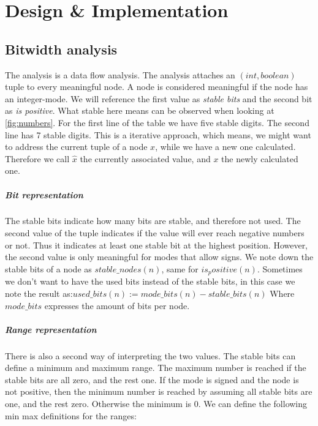 \chapter{Design \& Implementation}\label{sec:impl}

\section{Bitwidth analysis}
The analysis is a data flow analysis. The analysis attaches an $(int,boolean)$ tuple to every meaningful node. A node is considered meaningful if the node has an integer-mode. We will reference the first value as \emph{stable bits} and the second bit as \emph{is positive}. \newline
What stable here means can be observed when looking at \ref{fig:numbers}.
For the first line of the table we have five stable digits. The second line has 7 stable digits.\newline
This is a iterative approach, which means, we might want to address the current tuple of a node $x$, while we have a new one calculated. Therefore we call $\hat{x}$ the currently associated value, and $x$ the newly calculated one.

\paragraph{Bit representation}
The stable bits indicate how many bits are stable, and therefore not used.
The second value of the tuple indicates if the value will ever reach negative numbers or not. Thus it indicates at least one stable bit at the highest position. However, the second value is only meaningful for modes that allow signs. We note down the stable bits of a node as $stable\_nodes(n)$, same for $is_positive(n)$.
Sometimes we don't want to have the used bits instead of the stable bits, in this case we note the result as:$used\_bits(n):=mode\_bits(n)-stable\_bits(n)$
Where $mode\_bits$ expresses the amount of bits per node.

\paragraph{Range representation}
There is also a second way of interpreting the two values. The stable bits can define a minimum and maximum range. The maximum number is reached if the stable bits are all zero, and the rest one. If the mode is signed and the node is not positive, then the minimum number is reached by assuming all stable bits are one, and the rest zero. Otherwise the minimum is 0. We can define the following min max definitions for the ranges:

